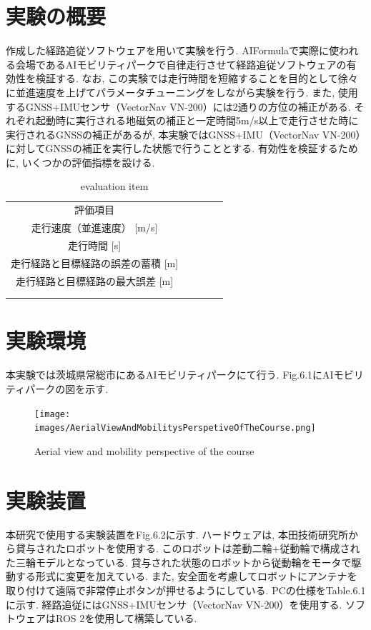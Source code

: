 
\section{実験の概要}
作成した経路追従ソフトウェアを用いて実験を行う.
AIFormulaで実際に使われる会場であるAIモビリティパークで自律走行させて経路追従ソフトウェアの有効性を検証する.
なお, この実験では走行時間を短縮することを目的として徐々に並進速度を上げてパラメータチューニングをしながら実験を行う.
また, 使用するGNSS+IMUセンサ（VectorNav VN-200）には2通りの方位の補正がある.
それぞれ起動時に実行される地磁気の補正と一定時間5m/s以上で走行させた時に実行されるGNSSの補正があるが,
本実験ではGNSS+IMU（VectorNav VN-200）に対してGNSSの補正を実行した状態で行うこととする.
有効性を検証するために, いくつかの評価指標を設ける.

\begin{table}[H]
  \centering
  \caption{evaluation item}
  \begin{tabular}{cclll}
  \cline{1-1}
  評価項目                    &  &  &  &  \\
  \cline{1-2}
  走行速度（並進速度） {[}m/s{]}    &  &  &  &  \\
  走行時間 {[}s{]}            &  &  &  &  \\
  走行経路と目標経路の誤差の蓄積 {[}m{]} &  &  &  &  \\
  走行経路と目標経路の最大誤差 {[}m{]}  &  &  &  &  \\
  \multicolumn{1}{l}{}    &  &  &  &  \\
  \multicolumn{1}{l}{}    &  &  &  & 
  \end{tabular}
\end{table}

\section{実験環境}
本実験では茨城県常総市にあるAIモビリティパークにて行う.
Fig.6.1にAIモビリティパークの図を示す.

\begin{figure}[H]
  \centering
 \texttt{[image: images/AerialViewAndMobilitysPerspetiveOfTheCourse.png]}
 \caption{Aerial view and mobility perspective of the course}
 \label{fig:course}
\end{figure}

\section{実験装置}
本研究で使用する実験装置をFig.6.2に示す.
ハードウェアは, 本田技術研究所から貸与されたロボットを使用する.
このロボットは差動二輪+従動輪で構成された三輪モデルとなっている.
貸与された状態のロボットから従動輪をモータで駆動する形式に変更を加えている.
また, 安全面を考慮してロボットにアンテナを取り付けて遠隔で非常停止ボタンが押せるようにしている.
PCの仕様をTable.6.1に示す.
経路追従にはGNSS+IMUセンサ（VectorNav VN-200）を使用する.
ソフトウェアはROS 2を使用して構築している.

